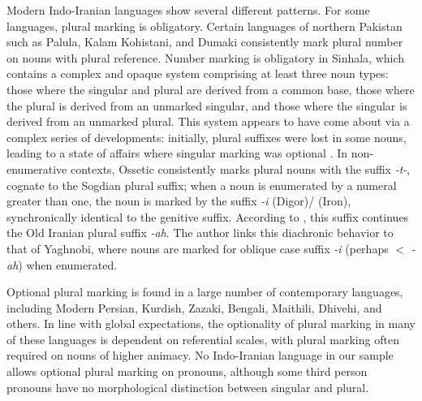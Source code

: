\documentclass[11pt]{article}
\begin{document}
Modern Indo-Iranian languages show several different patterns.
For some languages, plural marking is obligatory.
Certain languages of northern Pakistan such as Palula, Kalam Kohistani, and Dumaki consistently mark plural number on nouns with plural reference.
Number marking is obligatory in Sinhala, which contains a complex and opaque system comprising at least three noun types: those where the singular and plural are derived from a common base, those where the plural is derived from an unmarked singular, and those where the singular is derived from an unmarked plural. This system appears to have come about via a complex series of developments: 
initially, plural suffixes were lost in some nouns, leading to a state of affairs where singular marking was optional \citep{NitzNordhoff2010}. 
In non-enumerative contexts, Ossetic consistently marks plural nouns with the suffix {\it -t-}, cognate to the Sogdian plural suffix; when a noun is enumerated by a numeral greater than one, the noun is marked by the suffix {\it -i} (Digor)/{\it \IPA \textbari} (Iron), synchronically identical to the genitive suffix. According to \citet[132]{Thordarson2009}, this suffix continues the Old Iranian plural suffix {\it *-ah}. The author links this diachronic behavior to that of Yaghnobi, where nouns are marked for oblique case suffix {\it -i} (perhaps $<$ {\it *-ah}) when enumerated.

Optional plural marking is found in a large number of contemporary languages, including Modern Persian, Kurdish, Zazaki, Bengali, Maithili, Dhivehi, and others.
In line with global expectations, the optionality of plural marking in many of these languages is dependent on referential scales, with plural marking often required on nouns of higher animacy.
No Indo-Iranian language in our sample allows optional plural marking on pronouns, although some third person pronouns have no morphological distinction between singular and plural. %
\end{document}
